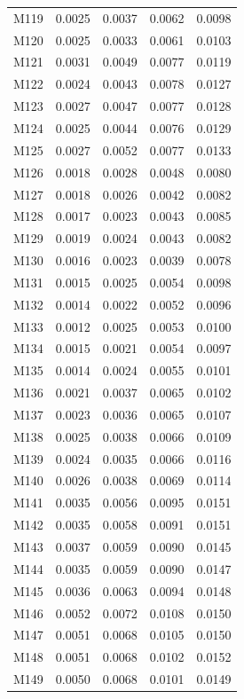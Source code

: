 \begin{longtable}{lrrrr}
M119 & 0.0025 & 0.0037 & 0.0062 & 0.0098 \\
M120 & 0.0025 & 0.0033 & 0.0061 & 0.0103 \\
M121 & 0.0031 & 0.0049 & 0.0077 & 0.0119 \\
M122 & 0.0024 & 0.0043 & 0.0078 & 0.0127 \\
M123 & 0.0027 & 0.0047 & 0.0077 & 0.0128 \\
M124 & 0.0025 & 0.0044 & 0.0076 & 0.0129 \\
M125 & 0.0027 & 0.0052 & 0.0077 & 0.0133 \\
M126 & 0.0018 & 0.0028 & 0.0048 & 0.0080 \\
M127 & 0.0018 & 0.0026 & 0.0042 & 0.0082 \\
M128 & 0.0017 & 0.0023 & 0.0043 & 0.0085 \\
M129 & 0.0019 & 0.0024 & 0.0043 & 0.0082 \\
M130 & 0.0016 & 0.0023 & 0.0039 & 0.0078 \\
M131 & 0.0015 & 0.0025 & 0.0054 & 0.0098 \\
M132 & 0.0014 & 0.0022 & 0.0052 & 0.0096 \\
M133 & 0.0012 & 0.0025 & 0.0053 & 0.0100 \\
M134 & 0.0015 & 0.0021 & 0.0054 & 0.0097 \\
M135 & 0.0014 & 0.0024 & 0.0055 & 0.0101 \\
M136 & 0.0021 & 0.0037 & 0.0065 & 0.0102 \\
M137 & 0.0023 & 0.0036 & 0.0065 & 0.0107 \\
M138 & 0.0025 & 0.0038 & 0.0066 & 0.0109 \\
M139 & 0.0024 & 0.0035 & 0.0066 & 0.0116 \\
M140 & 0.0026 & 0.0038 & 0.0069 & 0.0114 \\
M141 & 0.0035 & 0.0056 & 0.0095 & 0.0151 \\
M142 & 0.0035 & 0.0058 & 0.0091 & 0.0151 \\
M143 & 0.0037 & 0.0059 & 0.0090 & 0.0145 \\
M144 & 0.0035 & 0.0059 & 0.0090 & 0.0147 \\
M145 & 0.0036 & 0.0063 & 0.0094 & 0.0148 \\
M146 & 0.0052 & 0.0072 & 0.0108 & 0.0150 \\
M147 & 0.0051 & 0.0068 & 0.0105 & 0.0150 \\
M148 & 0.0051 & 0.0068 & 0.0102 & 0.0152 \\
M149 & 0.0050 & 0.0068 & 0.0101 & 0.0149 \\

\end{longtable}
